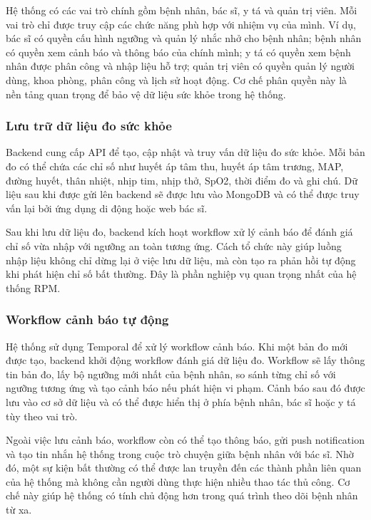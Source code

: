 \par Hệ thống có các vai trò chính gồm bệnh nhân, bác sĩ, y tá và quản trị viên. Mỗi vai trò chỉ được truy cập các chức năng phù hợp với nhiệm vụ của mình. Ví dụ, bác sĩ có quyền cấu hình ngưỡng và quản lý nhắc nhở cho bệnh nhân; bệnh nhân có quyền xem cảnh báo và thông báo của chính mình; y tá có quyền xem bệnh nhân được phân công và nhập liệu hỗ trợ; quản trị viên có quyền quản lý người dùng, khoa phòng, phân công và lịch sử hoạt động. Cơ chế phân quyền này là nền tảng quan trọng để bảo vệ dữ liệu sức khỏe trong hệ thống.

\subsubsection{Lưu trữ dữ liệu đo sức khỏe}
\par Backend cung cấp API để tạo, cập nhật và truy vấn dữ liệu đo sức khỏe. Mỗi bản đo có thể chứa các chỉ số như huyết áp tâm thu, huyết áp tâm trương, MAP, đường huyết, thân nhiệt, nhịp tim, nhịp thở, SpO2, thời điểm đo và ghi chú. Dữ liệu sau khi được gửi lên backend sẽ được lưu vào MongoDB và có thể được truy vấn lại bởi ứng dụng di động hoặc web bác sĩ.

\par Sau khi lưu dữ liệu đo, backend kích hoạt workflow xử lý cảnh báo để đánh giá chỉ số vừa nhập với ngưỡng an toàn tương ứng. Cách tổ chức này giúp luồng nhập liệu không chỉ dừng lại ở việc lưu dữ liệu, mà còn tạo ra phản hồi tự động khi phát hiện chỉ số bất thường. Đây là phần nghiệp vụ quan trọng nhất của hệ thống RPM.

\subsubsection{Workflow cảnh báo tự động}
\par Hệ thống sử dụng Temporal để xử lý workflow cảnh báo. Khi một bản đo mới được tạo, backend khởi động workflow đánh giá dữ liệu đo. Workflow sẽ lấy thông tin bản đo, lấy bộ ngưỡng mới nhất của bệnh nhân, so sánh từng chỉ số với ngưỡng tương ứng và tạo cảnh báo nếu phát hiện vi phạm. Cảnh báo sau đó được lưu vào cơ sở dữ liệu và có thể được hiển thị ở phía bệnh nhân, bác sĩ hoặc y tá tùy theo vai trò.

\par Ngoài việc lưu cảnh báo, workflow còn có thể tạo thông báo, gửi push notification và tạo tin nhắn hệ thống trong cuộc trò chuyện giữa bệnh nhân với bác sĩ. Nhờ đó, một sự kiện bất thường có thể được lan truyền đến các thành phần liên quan của hệ thống mà không cần người dùng thực hiện nhiều thao tác thủ công. Cơ chế này giúp hệ thống có tính chủ động hơn trong quá trình theo dõi bệnh nhân từ xa.

